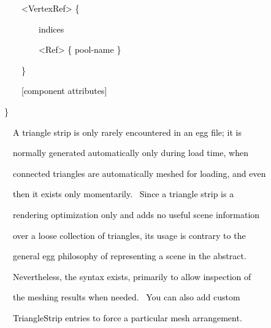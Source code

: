 \documentclass[a4paper]{article}
\newcommand\textstyleOOoComputerKeyWord[1]{\textrm{\textcolor[rgb]{0.0,0.0,0.5019608}{#1}}}
\begin{document}
{\color{black}
\textstyleOOoComputerKeyWord{\textcolor{black}{\ \ \ \ {\textless}VertexRef{\textgreater} \{ }}}

{\color{black}
\textstyleOOoComputerKeyWord{\textcolor{black}{\ \ \ \ \ \ \ \ indices }}}

{\color{black}
\textstyleOOoComputerKeyWord{\textcolor{black}{\ \ \ \ \ \ \ \ {\textless}Ref{\textgreater} \{ pool-name \} }}}

{\color{black}
\textstyleOOoComputerKeyWord{\textcolor{black}{\ \ \ \ \}}}}

{\color{black}
\textstyleOOoComputerKeyWord{\textcolor{black}{\ \ \ \ [component attributes]}}}

{\color{black}
\textstyleOOoComputerKeyWord{\textcolor{black}{\}}}}


\bigskip

{\color{black}
\textstyleOOoComputerKeyWord{\textcolor{black}{\ \ A triangle strip is only rarely encountered in an egg file; it is}}}

{\color{black}
\textstyleOOoComputerKeyWord{\textcolor{black}{\ \ normally generated automatically only during load time, when}}}

{\color{black}
\textstyleOOoComputerKeyWord{\textcolor{black}{\ \ connected triangles are automatically meshed for loading, and even}}}

{\color{black}
\textstyleOOoComputerKeyWord{\textcolor{black}{\ \ then it exists only momentarily. \ Since a triangle strip is a}}}

{\color{black}
\textstyleOOoComputerKeyWord{\textcolor{black}{\ \ rendering optimization only and adds no useful scene information}}}

{\color{black}
\textstyleOOoComputerKeyWord{\textcolor{black}{\ \ over a loose collection of triangles, its usage is contrary to the}}}

{\color{black}
\textstyleOOoComputerKeyWord{\textcolor{black}{\ \ general egg philosophy of representing a scene in the abstract.}}}

{\color{black}
\textstyleOOoComputerKeyWord{\textcolor{black}{\ \ Nevertheless, the syntax exists, primarily to allow inspection of}}}

{\color{black}
\textstyleOOoComputerKeyWord{\textcolor{black}{\ \ the meshing results when needed. \ You can also add custom}}}

{\color{black}
\textstyleOOoComputerKeyWord{\textcolor{black}{\ \ TriangleStrip entries to force a particular mesh arrangement.}}}
\end{document}
